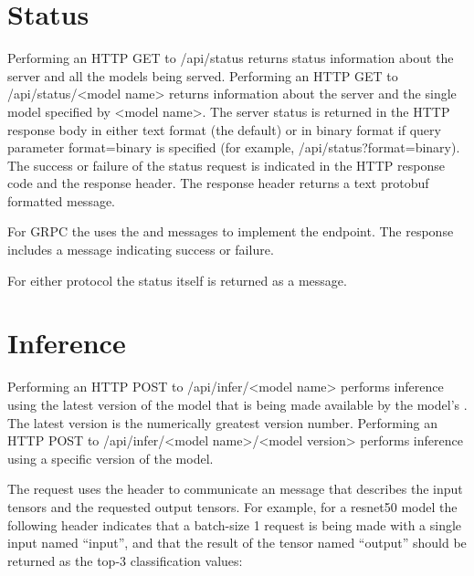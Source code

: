 \documentclass[letterpaper,10pt,english]{sphinxmanual}
\begin{document}
\section{Status}
\label{\detokenize{http_grpc_api:status}}\label{\detokenize{http_grpc_api:section-api-status}}
Performing an HTTP GET to /api/status returns status information about
the server and all the models being served. Performing an HTTP GET to
/api/status/\textless{}model name\textgreater{} returns information about the server and the
single model specified by \textless{}model name\textgreater{}. The server status is returned
in the HTTP response body in either text format (the default) or in
binary format if query parameter format=binary is specified (for
example, /api/status?format=binary). The success or failure of the
status request is indicated in the HTTP response code and the
 response header. The  response header
returns a text protobuf formatted  message.

For GRPC the  uses the
 and
messages to implement the endpoint. The response includes a
message indicating success or failure.

For either protocol the status itself is returned as a
message.


\section{Inference}
\label{\detokenize{http_grpc_api:inference}}\label{\detokenize{http_grpc_api:section-api-inference}}
Performing an HTTP POST to /api/infer/\textless{}model name\textgreater{} performs inference
using the latest version of the model that is being made available by
the model’s {\hyperref[\detokenize{model_configuration:section-version-policy}]{}}. The latest
version is the numerically greatest version number. Performing an HTTP
POST to /api/infer/\textless{}model name\textgreater{}/\textless{}model version\textgreater{} performs inference
using a specific version of the model.

The request uses the  header to communicate an
 message that describes
the input tensors and the requested output tensors. For example, for a
resnet50 model the following  header indicates that
a batch-size 1 request is being made with a single input named
“input”, and that the result of the tensor named “output” should be
returned as the top-3 classification values:
\end{document}
